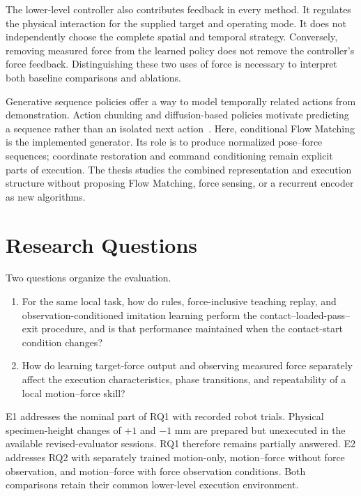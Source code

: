 The lower-level controller also contributes feedback in every method. It regulates the physical interaction for the supplied target and operating mode. It does not independently choose the complete spatial and temporal strategy. Conversely, removing measured force from the learned policy does not remove the controller's force feedback. Distinguishing these two uses of force is necessary to interpret both baseline comparisons and ablations.

Generative sequence policies offer a way to model temporally related actions from demonstration. Action chunking and diffusion-based policies motivate predicting a sequence rather than an isolated next action~\cite{zhao2023act,chi2023diffusionpolicy}. Here, conditional Flow Matching is the implemented generator. Its role is to produce normalized pose--force sequences; coordinate restoration and command conditioning remain explicit parts of execution. The thesis studies the combined representation and execution structure without proposing Flow Matching, force sensing, or a recurrent encoder as new algorithms.

\section{Research Questions}
Two questions organize the evaluation.
\begin{enumerate}[label=\textbf{RQ\arabic*:},leftmargin=1.8cm]
\item For the same local task, how do rules, force-inclusive teaching replay, and observation-conditioned imitation learning perform the contact--loaded-pass--exit procedure, and is that performance maintained when the contact-start condition changes?
\item How do learning target-force output and observing measured force separately affect the execution characteristics, phase transitions, and repeatability of a local motion--force skill?
\end{enumerate}
E1 addresses the nominal part of RQ1 with recorded robot trials. Physical specimen-height changes of \(+1\) and \(-1\) mm are prepared but unexecuted in the available revised-evaluator sessions. RQ1 therefore remains partially answered. E2 addresses RQ2 with separately trained motion-only, motion--force without force observation, and motion--force with force observation conditions. Both comparisons retain their common lower-level execution environment.


